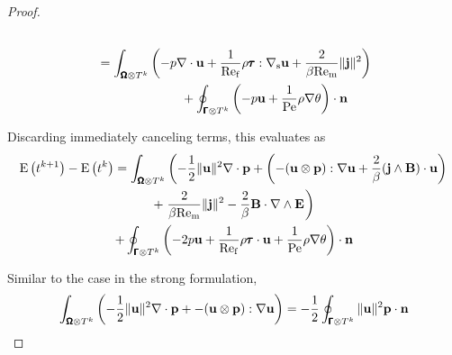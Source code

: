 \begin{proof}
\begin{align}
\begin{split}
                \end{split}  \\
                \begin{split}
                    &=  \int_{\pmb{\mathsf{\Omega}}\otimes T^{k}}\left(- p\nabla\cdot\mathbf{u} + \frac{1}{\mathrm{Re}_{\mathrm{f}}}\rho\pmb{\mathsf{\tau}}:\nabla_{\mathrm{s}}\mathbf{u} + \frac{2}{\beta\mathrm{Re}_{\mathrm{m}}}\|\mathbf{j}\|^{2}\right)  \\
                    &\;\;\;\;\;\;\;\;\;\;\;\;\;\;\;\;\;\;\;\;\;\;\;\;+ \oint_{\pmb{\mathsf{\Gamma}}\otimes T^{k}}\left(- p\mathbf{u} + \frac{1}{\mathrm{Pe}}\rho\nabla\theta\right)\cdot\mathbf{n}
                \end{split}
            \end{align}
    
            Discarding immediately canceling terms, this evaluates as
            \begin{multline}
                \rmE\left(t^{k + 1}\right) - \rmE\left(t^{k}\right)  =  \int_{\bfOmega\otimes T^{k}}\left( - \frac{1}{2}\|\bfu\|^{2}\nabla\cdot\bfp + \left(- (\bfu\otimes\bfp):\nabla\bfu + \frac{2}{\beta}(\bfj\wedge\bfB)\cdot\bfu\right)\right.  \\
                + \left.\frac{2}{\beta\rmRem}\|\bfj\|^{2} - \frac{2}{\beta}\bfB\cdot\nabla\wedge\bfE\tall\right)  \\
                + \oint_{\bfGamma\otimes T^{k}}\left(- 2p\bfu + \frac{1}{\rmRef}\rho\bftau\cdot\bfu + \frac{1}{\rmPe}\rho\nabla\theta\right)\cdot\bfn
            \end{multline}
            
            Similar to the case in the strong formulation,
            \begin{equation}
                \int_{\pmb{\mathsf{\Omega}}\otimes T^{k}}\left( - \frac{1}{2}\|\mathbf{u}\|^{2}\nabla\cdot\mathbf{p} + - (\mathbf{u}\otimes\mathbf{p}):\nabla\mathbf{u}\right)  =  - \frac{1}{2}\oint_{\pmb{\mathsf{\Gamma}}\otimes T^{k}}\|\mathbf{u}\|^{2}\mathbf{p}\cdot\mathbf{n}
            \end{equation}
            

\end{proof}
